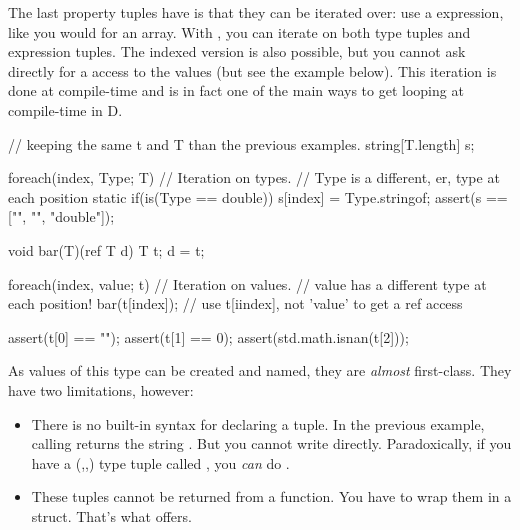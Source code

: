 The last property tuples have is that they can be iterated over: use a  expression, like you would for an array. With , you can iterate on both type tuples and expression tuples. The indexed version is also possible, but you cannot ask directly for a  access to the values (but see the example below). This iteration is done at compile-time and is in fact one of the main ways to get looping at compile-time in D.

\begin{dcode}
// keeping the same t and T than the previous examples.
string[T.length] s;

foreach(index, Type; T) // Iteration on types.
                        // Type is a different, er, type at each position
{
    static if(is(Type == double))
        s[index] = Type.stringof;
}
assert(s ==  ["", "", "double"]);

void bar(T)(ref T d) { T t; d = t;}

foreach(index, value; t) // Iteration on values.
                         // value has a different type at each position!
{
    bar(t[index]); // use t[iindex], not 'value' to get a ref access
}

assert(t[0] == "");
assert(t[1] == 0);
assert(std.math.isnan(t[2]));
\end{dcode}

As values of this type can be created and named, they are \emph{almost} first-class. They have two limitations, however: 

\begin{itemize}
\item There is no built-in syntax for declaring a tuple. In the previous example, calling  returns the string \DD{,}\DD{,}. But you cannot write \DD{(}\DD{,}\DD{,} directly. Paradoxically, if you have a (,,) type tuple called , you \emph{can} do .
\item These tuples cannot be returned from a function. You have to wrap them in a struct. That's what  offers.
\end{itemize}

